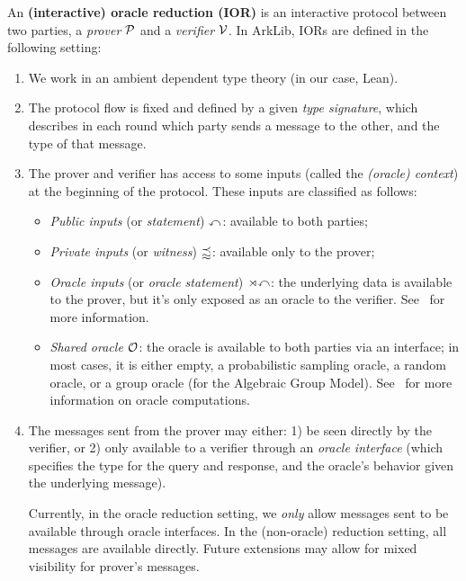 An \textbf{(interactive) oracle reduction (IOR)} is an interactive protocol between two parties, a
\emph{prover} \(\IORProver\) and a \emph{verifier} \(\IORVerifier\). In ArkLib, IORs are defined in the
following setting:
\begin{enumerate}
    \item We work in an ambient dependent type theory (in our case, Lean).

    \item The protocol flow is fixed and defined by a given \emph{type signature}, which
    describes in each round which party sends a message to the other, and the type of that message.

    \item The prover and verifier has access to some inputs (called the \emph{(oracle) context}) at
    the beginning of the protocol. These inputs are classified as follows:
    \begin{itemize}
        \item \emph{Public inputs} (or \emph{statement}) \(\Instance\): available to both parties;
        \item \emph{Private inputs} (or \emph{witness}) \(\WitnessValue\): available only to the prover;
        \item \emph{Oracle inputs} (or \emph{oracle statement}) \(\mathbbm{ox}\): the underlying data
        is available to the prover, but it's only exposed as an oracle to the verifier.
        See~ for more information.
        \item \emph{Shared oracle} \(\AmbientOracles\): the oracle is available to both parties via an
        interface; in most cases, it is either empty, a probabilistic sampling oracle, a random
        oracle, or a group oracle (for the Algebraic Group Model). See~ for more
        information on oracle computations.
    \end{itemize}

    \item The messages sent from the prover may either: 1) be seen directly by the verifier, or 2)
    only available to a verifier through an \emph{oracle interface} (which specifies the type for
    the query and response, and the oracle's behavior given the underlying message).

    Currently, in the oracle reduction setting, we \emph{only} allow messages sent to be available
    through oracle interfaces. In the (non-oracle) reduction setting, all messages are available
    directly. Future extensions may allow for mixed visibility for prover's messages.


\end{enumerate}
